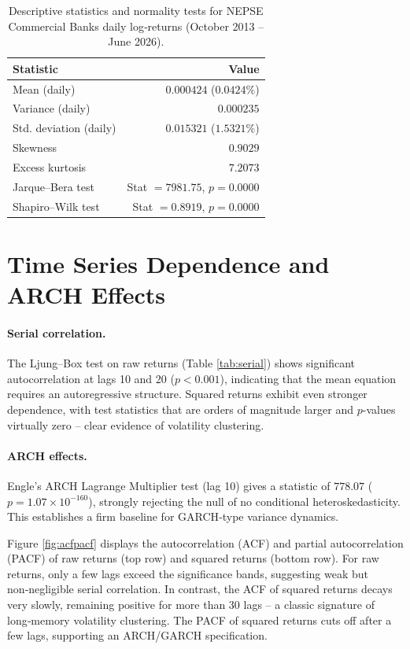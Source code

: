 \begin{table}[H]
\centering
\caption{Descriptive statistics and normality tests for NEPSE Commercial Banks daily log‑returns (October 2013 – June 2026).}
\label{tab:desc}
\begin{tabular}{l r}
\toprule
Statistic & Value \\
\midrule
Mean (daily) & $0.000424$ ($0.0424\%$) \\
Variance (daily) & $0.000235$ \\
Std. deviation (daily) & $0.015321$ ($1.5321\%$) \\
Skewness & $0.9029$ \\
Excess kurtosis & $7.2073$ \\
Jarque–Bera test & Stat $= 7981.75$, $p = 0.0000$ \\
Shapiro–Wilk test & Stat $= 0.8919$, $p = 0.0000$ \\
\bottomrule
\end{tabular}
\end{table}

\section{Time Series Dependence and ARCH Effects}
\paragraph{Serial correlation.}
The Ljung–Box test on raw returns (Table \ref{tab:serial}) shows significant autocorrelation at lags 10 and 20 ($p<0.001$), indicating that the mean equation requires an autoregressive structure. Squared returns exhibit even stronger dependence, with test statistics that are orders of magnitude larger and $p$-values virtually zero – clear evidence of volatility clustering.

\paragraph{ARCH effects.}
Engle’s ARCH Lagrange Multiplier test (lag 10) gives a statistic of $778.07$ ($p=1.07\times10^{-160}$), strongly rejecting the null of no conditional heteroskedasticity. This establishes a firm baseline for GARCH‑type variance dynamics.

Figure \ref{fig:acfpacf} displays the autocorrelation (ACF) and partial autocorrelation (PACF) of raw returns (top row) and squared returns (bottom row). For raw returns, only a few lags exceed the significance bands, suggesting weak but non‑negligible serial correlation. In contrast, the ACF of squared returns decays very slowly, remaining positive for more than 30 lags – a classic signature of long‑memory volatility clustering. The PACF of squared returns cuts off after a few lags, supporting an ARCH/GARCH specification.

